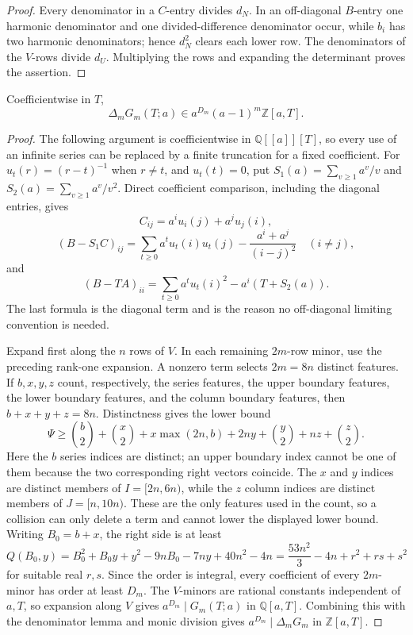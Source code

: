 \begin{proof}
Every denominator in a \(C\)-entry divides \(d_N\).  In an off-diagonal
\(B\)-entry one harmonic denominator and one divided-difference denominator
occur, while \(b_i\) has two harmonic denominators; hence \(d_N^2\) clears
each lower row.  The denominators of the \(V\)-rows divide \(d_U\).
Multiplying the rows and expanding the determinant proves the assertion.
\end{proof}

\begin{lemma}
\label{lem:v-formal-divisor}
Coefficientwise in \(T\),
\[
 \Delta_mG_m(T;a)\in a^{D_m}(a-1)^m\mathbb Z[a,T].
\]
\end{lemma}

\begin{proof}
The following argument is coefficientwise in \(\mathbb Q[[a]][T]\), so
every use of an infinite series can be replaced by a finite truncation for a
fixed coefficient.  For \(u_t(r)=(r-t)^{-1}\) when \(r\ne t\), and
\(u_t(t)=0\), put \(S_1(a)=\sum_{v\ge1}a^v/v\) and
\(S_2(a)=\sum_{v\ge1}a^v/v^2\).  Direct coefficient comparison, including
the diagonal entries, gives
\[
 C_{ij}=a^i u_i(j)+a^j u_j(i),
\]
\[
 (B-S_1C)_{ij}
 =\sum_{t\ge0}a^tu_t(i)u_t(j)-\frac{a^i+a^j}{(i-j)^2}
 \quad(i\ne j),
\]
and
\[
 (B-TA)_{ii}=\sum_{t\ge0}a^tu_t(i)^2-a^i(T+S_2(a)).
\]
The last formula is the diagonal term and is the reason no off-diagonal
limiting convention is needed.

Expand first along the \(n\) rows of \(V\).  In each remaining \(2m\)-row
minor, use the preceding rank-one expansion.  A nonzero term selects
\(2m=8n\) distinct features.  If \(b,x,y,z\) count, respectively, the
series features, the upper boundary features, the lower boundary features,
and the column boundary features, then \(b+x+y+z=8n\).  Distinctness gives
the lower bound
\[
 \Psi\ge {b\choose2}+{x\choose2}+x\max(2n,b)
       +2ny+{y\choose2}+nz+{z\choose2}.
\]
Here the \(b\) series indices are distinct; an upper boundary index cannot
be one of them because the two corresponding right vectors coincide.  The
\(x\) and \(y\) indices are distinct members of \(I=[2n,6n)\), while the
\(z\) column indices are distinct members of \(J=[n,10n)\).  These are the
only features used in the count, so a collision can only delete a term and
cannot lower the displayed lower bound.
Writing \(B_0=b+x\), the right side is at least
\[
 Q(B_0,y)=B_0^2+B_0y+y^2-9nB_0-7ny+40n^2-4n
 =\frac{53n^2}{3}-4n+r^2+rs+s^2
\]
for suitable real \(r,s\).  Since the order is integral, every coefficient
of every \(2m\)-minor has order at least \(D_m\).  The \(V\)-minors are
rational constants independent of \(a,T\), so expansion along \(V\) gives
\(a^{D_m}\mid G_m(T;a)\) in \(\mathbb Q[a,T]\).  Combining this with the
denominator lemma and monic division gives
\(a^{D_m}\mid\Delta_mG_m\) in \(\mathbb Z[a,T]\).


\end{proof}
